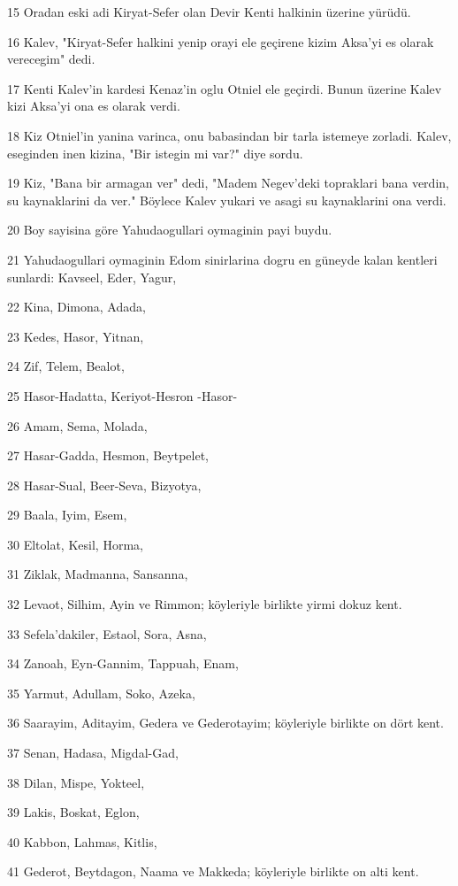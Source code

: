 \par 15 Oradan eski adi Kiryat-Sefer olan Devir Kenti halkinin üzerine yürüdü.
\par 16 Kalev, "Kiryat-Sefer halkini yenip orayi ele geçirene kizim Aksa'yi es olarak verecegim" dedi.
\par 17 Kenti Kalev'in kardesi Kenaz'in oglu Otniel ele geçirdi. Bunun üzerine Kalev kizi Aksa'yi ona es olarak verdi.
\par 18 Kiz Otniel'in yanina varinca, onu babasindan bir tarla istemeye zorladi. Kalev, eseginden inen kizina, "Bir istegin mi var?" diye sordu.
\par 19 Kiz, "Bana bir armagan ver" dedi, "Madem Negev'deki topraklari bana verdin, su kaynaklarini da ver." Böylece Kalev yukari ve asagi su kaynaklarini ona verdi.
\par 20 Boy sayisina göre Yahudaogullari oymaginin payi buydu.
\par 21 Yahudaogullari oymaginin Edom sinirlarina dogru en güneyde kalan kentleri sunlardi: Kavseel, Eder, Yagur,
\par 22 Kina, Dimona, Adada,
\par 23 Kedes, Hasor, Yitnan,
\par 24 Zif, Telem, Bealot,
\par 25 Hasor-Hadatta, Keriyot-Hesron -Hasor-
\par 26 Amam, Sema, Molada,
\par 27 Hasar-Gadda, Hesmon, Beytpelet,
\par 28 Hasar-Sual, Beer-Seva, Bizyotya,
\par 29 Baala, Iyim, Esem,
\par 30 Eltolat, Kesil, Horma,
\par 31 Ziklak, Madmanna, Sansanna,
\par 32 Levaot, Silhim, Ayin ve Rimmon; köyleriyle birlikte yirmi dokuz kent.
\par 33 Sefela'dakiler, Estaol, Sora, Asna,
\par 34 Zanoah, Eyn-Gannim, Tappuah, Enam,
\par 35 Yarmut, Adullam, Soko, Azeka,
\par 36 Saarayim, Aditayim, Gedera ve Gederotayim; köyleriyle birlikte on dört kent.
\par 37 Senan, Hadasa, Migdal-Gad,
\par 38 Dilan, Mispe, Yokteel,
\par 39 Lakis, Boskat, Eglon,
\par 40 Kabbon, Lahmas, Kitlis,
\par 41 Gederot, Beytdagon, Naama ve Makkeda; köyleriyle birlikte on alti kent.
